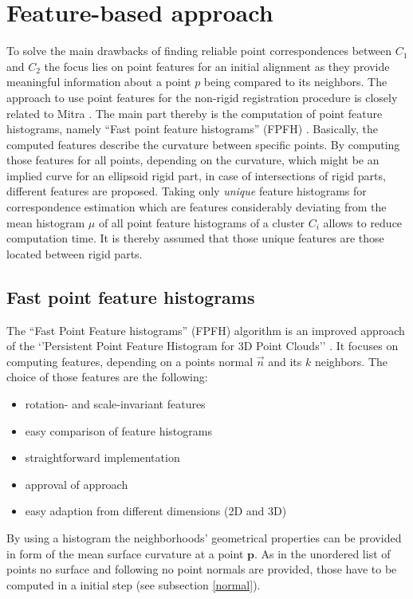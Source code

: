 \chapter{Feature-based approach}
\label{cha:FeatureApproach}


To solve the main drawbacks of finding reliable point correspondences between $C_1$ and $C_2$ the focus lies on point features for an initial alignment as they provide meaningful information about a point $p$ being compared to its neighbors. The approach to use point features for the non-rigid registration procedure is closely related to Mitra \cite{Mitra07}. The main part thereby is the computation of point feature histograms, namely ``Fast point feature histograms'' (FPFH) \cite{FPFH}. Basically, the computed features describe the curvature between specific points. By computing those features for all points, depending on the curvature, which might be an implied curve for an ellipsoid rigid part, in case of intersections of rigid parts, different features are proposed. Taking only \textit{unique} feature histograms for correspondence estimation which are features considerably deviating from the mean histogram $\mu$ of all point feature histograms of a cluster $C_i$  allows to reduce computation time. It is thereby assumed that those unique features are those located between rigid parts.

\section{Fast point feature histograms}
\label{FPFH}
The ``Fast Point Feature histograms'' (FPFH) algorithm is an improved approach of the `'Persistent Point Feature Histogram for 3D Point Clouds'' \cite{PPFH}. It focuses on computing features, depending on a points normal $\vec{n}$ and its $k$ neighbors.  The choice of those features are the following: 
\begin{itemize}
	\item rotation- and scale-invariant features
	\item easy comparison of feature histograms
	\item straightforward implementation
	\item approval of approach
	\item easy adaption from different dimensions (2D and 3D)
\end{itemize}
By using a histogram the neighborhoods' geometrical properties can be provided in form of the mean surface curvature at a point $\boldsymbol{p}$. As in the unordered list of points no surface and following no point normals are provided, those have to be computed in a initial step (see subsection \ref{normal}).

